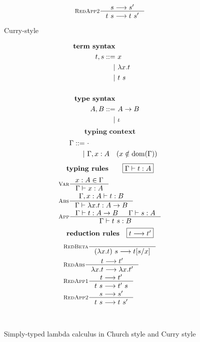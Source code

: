 \begin{figure}
\begin{singlespace}
\begin{minipage}{.46\textwidth}
\begin{align*}
& \inference[\sc RedApp2]{s --> s'}{t~s --> t~s'} \\
\end{align*}
\end{minipage}
\begin{minipage}{.46\textwidth}
	\begin{center}Curry-style\end{center}
\def\baselinestretch{0}
\small
\begin{align*}
\textbf{term syntax} \\
t,s ::= &~ x           \\
      | &~ \lambda x    . t \\
      | &~ t ~ s       \\
\\
\textbf{type syntax} \\
A,B ::= &~ A -> B \\
      | &~ \iota  \\
\end{align*}
\[ \textbf{typing context} \]\vspace*{-1em}
\begin{align*}\quad
\Gamma ::= &~ \cdot \\
	 | &~ \Gamma, x:A \quad (x\notin \mathop{\mathrm{dom}}(\Gamma)) \\
\end{align*}
\[ \textbf{typing rules}
	\qquad \framebox{$\Gamma |- t : A$} \]
\vspace*{-1em}
\begin{align*}
& \inference[\sc Var]{x:A \in \Gamma}{\Gamma |- x:A} \\
& \inference[\sc Abs]{\Gamma,x:A |- t : B}
		     {\Gamma |- \l x   .t : A -> B} \\
& \inference[\sc App]{\Gamma |- t : A -> B & \Gamma |- s : A}
		     {\Gamma |- t~s : B} \\
\end{align*}
\[ \textbf{reduction rules}
	\quad \framebox{$t --> t'$} \]
\vspace*{-1em}
\begin{align*}
& \inference[\sc RedBeta]{}{(\l x   .t)~s --> t[s/x]} \\
& \inference[\sc RedAbs]{t --> t'}{\l x   .t --> \l x   .t'} \\
& \inference[\sc RedApp1]{t --> t'}{t~s --> t'~s} \\
& \inference[\sc RedApp2]{s --> s'}{t~s --> t~s'} \\
\end{align*}
\end{minipage}
~\\
\caption{Simply-typed lambda calculus in Church style and Curry style}
\label{fig:stlc}
\end{singlespace}
\end{figure}
